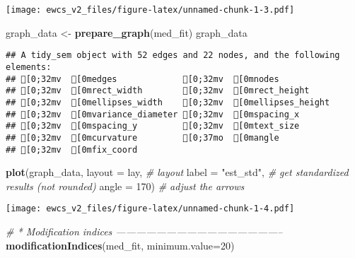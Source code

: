 \documentclass[
]{article}
\newenvironment{Shaded}{\begin{snugshade}}{\end{snugshade}}
\newcommand{\CommentTok}[1]{\textcolor[rgb]{0.56,0.35,0.01}{\textit{#1}}}
\newcommand{\DataTypeTok}[1]{\textcolor[rgb]{0.13,0.29,0.53}{#1}}
\newcommand{\DecValTok}[1]{\textcolor[rgb]{0.00,0.00,0.81}{#1}}
\newcommand{\KeywordTok}[1]{\textcolor[rgb]{0.13,0.29,0.53}{\textbf{#1}}}
\newcommand{\NormalTok}[1]{#1}
\newcommand{\StringTok}[1]{\textcolor[rgb]{0.31,0.60,0.02}{#1}}
\begin{document}
\texttt{[image: ewcs\_v2\_files/figure-latex/unnamed-chunk-1-3.pdf]}

\begin{Shaded}
\begin{Highlighting}[]
\NormalTok{graph_data <-}\StringTok{ }\KeywordTok{prepare_graph}\NormalTok{(med_fit)}
\NormalTok{graph_data}
\end{Highlighting}
\end{Shaded}

\begin{verbatim}
## A tidy_sem object with 52 edges and 22 nodes, and the following elements:
## [0;32mv  [0medges             [0;32mv  [0mnodes
## [0;32mv  [0mrect_width        [0;32mv  [0mrect_height
## [0;32mv  [0mellipses_width    [0;32mv  [0mellipses_height
## [0;32mv  [0mvariance_diameter [0;32mv  [0mspacing_x
## [0;32mv  [0mspacing_y         [0;32mv  [0mtext_size
## [0;32mv  [0mcurvature         [0;37mo  [0mangle
## [0;32mv  [0mfix_coord
\end{verbatim}

\begin{Shaded}
\begin{Highlighting}[]
\KeywordTok{plot}\NormalTok{(graph_data,}
     \DataTypeTok{layout =}\NormalTok{ lay,        }\CommentTok{# layout}
     \DataTypeTok{label =} \StringTok{"est_std"}\NormalTok{,   }\CommentTok{# get standardized results (not rounded)}
     \DataTypeTok{angle =} \DecValTok{170}\NormalTok{)         }\CommentTok{# adjust the arrows}
\end{Highlighting}
\end{Shaded}

\texttt{[image: ewcs\_v2\_files/figure-latex/unnamed-chunk-1-4.pdf]}

\begin{Shaded}
\begin{Highlighting}[]
\CommentTok{# * Modification indices --------------------------------------------------}
\KeywordTok{modificationIndices}\NormalTok{(med_fit, }\DataTypeTok{minimum.value=}\DecValTok{20}\NormalTok{)}
\end{Highlighting}
\end{Shaded}
\end{document}
